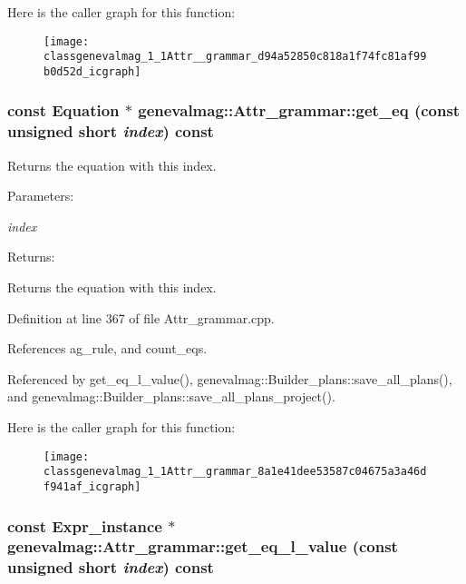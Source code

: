 Here is the caller graph for this function:\nopagebreak
\begin{figure}[H]
\begin{center}
\leavevmode
\texttt{[image: classgenevalmag\_1\_1Attr\_\_grammar\_d94a52850c818a1f74fc81af99b0d52d\_icgraph]}
\end{center}
\end{figure}
\hypertarget{classgenevalmag_1_1Attr__grammar_8a1e41dee53587c04675a3a46df941af}{
\subsubsection[{get\_\-eq}]{\setlength{\rightskip}{0pt plus 5cm}const {\bf Equation} $\ast$ genevalmag::Attr\_\-grammar::get\_\-eq (const unsigned short {\em index}) const}}
\label{classgenevalmag_1_1Attr__grammar_8a1e41dee53587c04675a3a46df941af}


Returns the equation with this index. \begin{Desc}
\item[Parameters:]
\begin{description}
\item[{\em index}]\end{description}
\end{Desc}
\begin{Desc}
\item[Returns:]\end{Desc}
Returns the equation with this index. 

Definition at line 367 of file Attr\_\-grammar.cpp.

References ag\_\-rule, and count\_\-eqs.

Referenced by get\_\-eq\_\-l\_\-value(), genevalmag::Builder\_\-plans::save\_\-all\_\-plans(), and genevalmag::Builder\_\-plans::save\_\-all\_\-plans\_\-project().

Here is the caller graph for this function:\nopagebreak
\begin{figure}[H]
\begin{center}
\leavevmode
\texttt{[image: classgenevalmag\_1\_1Attr\_\_grammar\_8a1e41dee53587c04675a3a46df941af\_icgraph]}
\end{center}
\end{figure}
\hypertarget{classgenevalmag_1_1Attr__grammar_9d743d32f7ecb1f31284d04db9e3051e}{
\subsubsection[{get\_\-eq\_\-l\_\-value}]{\setlength{\rightskip}{0pt plus 5cm}const {\bf Expr\_\-instance} $\ast$ genevalmag::Attr\_\-grammar::get\_\-eq\_\-l\_\-value (const unsigned short {\em index}) const}}
\label{classgenevalmag_1_1Attr__grammar_9d743d32f7ecb1f31284d04db9e3051e}



